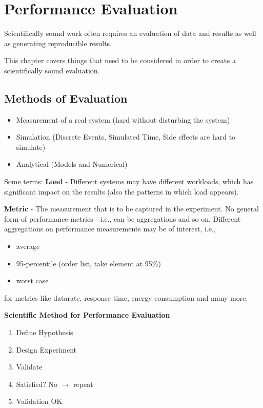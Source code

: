 \chapter{Performance Evaluation} \label{CHAP:PERFEVAL}

Scientifically sound work often requires an evaluation of data and results as well as generating reproducible results.

This chapter covers things that need to be considered in order to create a scientifically sound evaluation.

\section{Methods of Evaluation}

\begin{itemize}
    \item Measurement of a real system (hard without disturbing the system)
    \item Simulation (Discrete Events, Simulated Time, Side effects are hard to simulate)
    \item Analytical (Models and Numerical)
\end{itemize}

Some terms: \textbf{Load} - Different systems may have different workloads, which has significant impact on the results (also the patterns in which load appears).

\textbf{Metric} - The measurement that is to be captured in the experiment. No general form of performance metrics - i.e., can be aggregations and so on. Different aggregations on performance measurements may be of interest, i.e.,

\begin{itemize}
    \item average
    \item 95-percentile (order list, take element at 95\%)
    \item worst case
\end{itemize}

for metrics like datarate, response time, energy consumption and many more.

\textbf{Scientific Method for Performance Evaluation}

\begin{enumerate}
    \item Define Hypothesis
    \item Design Experiment
    \item Validate
    \item Satisfied? No $\rightarrow$ repeat
    \item Validation OK
\end{enumerate}


